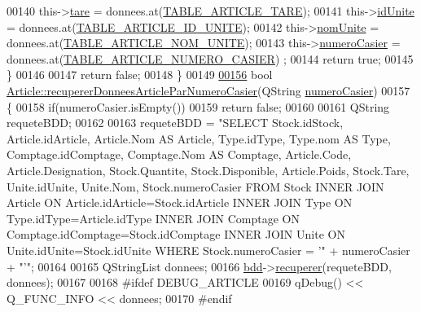 \begin{DoxyCode}
00140         this->\hyperlink{class_article_abacf2d29d4b2e3e7b49256bc48d5fe64}{tare} = donnees.at(\hyperlink{_article_8h_a159354683cfd6e1b578172fbe6490ab6a970d883b74adb323da887e30bef922f5}{TABLE\_ARTICLE\_TARE});
00141         this->\hyperlink{class_article_a702cff16cb9cd0774383ceba81d83869}{idUnite} = donnees.at(\hyperlink{_article_8h_a159354683cfd6e1b578172fbe6490ab6aa27f54cec32c08b45beaf39f1259ae92}{TABLE\_ARTICLE\_ID\_UNITE});
00142         this->\hyperlink{class_article_a43a20e248e57150af0546c9f4b6b74c3}{nomUnite} = donnees.at(\hyperlink{_article_8h_a159354683cfd6e1b578172fbe6490ab6abc2184dab6c03e59872ced7183608174}{TABLE\_ARTICLE\_NOM\_UNITE});
00143         this->\hyperlink{class_article_a4b8dd9598cc16200c60c7f55196fc26d}{numeroCasier} = donnees.at(\hyperlink{_article_8h_a159354683cfd6e1b578172fbe6490ab6a43ae9bea39dd3f12e8732bcd2d7c0223}{TABLE\_ARTICLE\_NUMERO\_CASIER})
      ;
00144         \textcolor{keywordflow}{return} \textcolor{keyword}{true};
00145     \}
00146 
00147     \textcolor{keywordflow}{return} \textcolor{keyword}{false};
00148 \}
00149 
\hyperlink{class_article_a5d8241c703f142bbc8b011f867fd953f}{00156} \textcolor{keywordtype}{bool} \hyperlink{class_article_a5d8241c703f142bbc8b011f867fd953f}{Article::recupererDonneesArticleParNumeroCasier}(QString
       \hyperlink{class_article_a4b8dd9598cc16200c60c7f55196fc26d}{numeroCasier})
00157 \{
00158     \textcolor{keywordflow}{if}(numeroCasier.isEmpty())
00159         \textcolor{keywordflow}{return} \textcolor{keyword}{false};
00160 
00161     QString requeteBDD;
00162 
00163     requeteBDD = \textcolor{stringliteral}{"SELECT Stock.idStock, Article.idArticle, Article.Nom AS Article, Type.idType, Type.nom AS
       Type, Comptage.idComptage, Comptage.Nom AS Comptage, Article.Code, Article.Designation, Stock.Quantite,
       Stock.Disponible, Article.Poids, Stock.Tare, Unite.idUnite, Unite.Nom, Stock.numeroCasier FROM Stock INNER JOIN
       Article ON Article.idArticle=Stock.idArticle INNER JOIN Type ON Type.idType=Article.idType INNER JOIN
       Comptage ON Comptage.idComptage=Stock.idComptage INNER JOIN Unite ON Unite.idUnite=Stock.idUnite WHERE
       Stock.numeroCasier = '"} + numeroCasier + \textcolor{stringliteral}{"'"};
00164 
00165     QStringList donnees;
00166     \hyperlink{class_article_a7221cec4212d86d74f479b9ee683ee8a}{bdd}->\hyperlink{class_bdd_a8f25d29d309041bbf875700db0efd97b}{recuperer}(requeteBDD, donnees);
00167 
00168 \textcolor{preprocessor}{    #ifdef DEBUG\_ARTICLE}
00169         qDebug() << Q\_FUNC\_INFO << donnees;
00170 \textcolor{preprocessor}{    #endif}

\end{DoxyCode}
